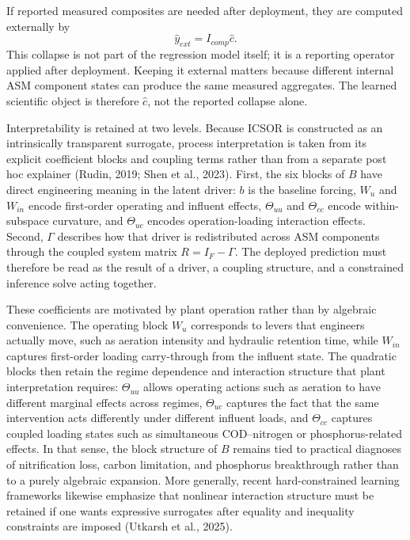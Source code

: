 \documentclass[a4paper,fleqn]{cas-sc}
\newenvironment{revblock}{\begingroup\color{revDefault}}{\endgroup}
\begin{document}
\begin{revblock}
If reported measured composites are needed after deployment, they are computed externally by
\begin{equation}
\label{eq:external-reporting}
\hat{y}_{ext} = I_{comp}\hat{c}.
\end{equation}
This collapse is not part of the regression model itself; it is a reporting operator applied after deployment. Keeping it external matters because different internal ASM component states can produce the same measured aggregates. The learned scientific object is therefore $\hat{c}$, not the reported collapse alone.

Interpretability is retained at two levels. Because ICSOR is constructed as an intrinsically transparent surrogate, process interpretation is taken from its explicit coefficient blocks and coupling terms rather than from a separate post hoc explainer (Rudin, 2019; Shen et al., 2023). First, the six blocks of $B$ have direct engineering meaning in the latent driver: $b$ is the baseline forcing, $W_u$ and $W_{in}$ encode first-order operating and influent effects, $\Theta_{uu}$ and $\Theta_{cc}$ encode within-subspace curvature, and $\Theta_{uc}$ encodes operation-loading interaction effects. Second, $\Gamma$ describes how that driver is redistributed across ASM components through the coupled system matrix $R = I_F - \Gamma$. The deployed prediction must therefore be read as the result of a driver, a coupling structure, and a constrained inference solve acting together.

These coefficients are motivated by plant operation rather than by algebraic convenience. The operating block $W_u$ corresponds to levers that engineers actually move, such as aeration intensity and hydraulic retention time, while $W_{in}$ captures first-order loading carry-through from the influent state. The quadratic blocks then retain the regime dependence and interaction structure that plant interpretation requires: $\Theta_{uu}$ allows operating actions such as aeration to have different marginal effects across regimes, $\Theta_{uc}$ captures the fact that the same intervention acts differently under different influent loads, and $\Theta_{cc}$ captures coupled loading states such as simultaneous COD--nitrogen or phosphorus-related effects. In that sense, the block structure of $B$ remains tied to practical diagnoses of nitrification loss, carbon limitation, and phosphorus breakthrough rather than to a purely algebraic expansion. More generally, recent hard-constrained learning frameworks likewise emphasize that nonlinear interaction structure must be retained if one wants expressive surrogates after equality and inequality constraints are imposed (Utkarsh et al., 2025).


\end{revblock}
\end{document}
